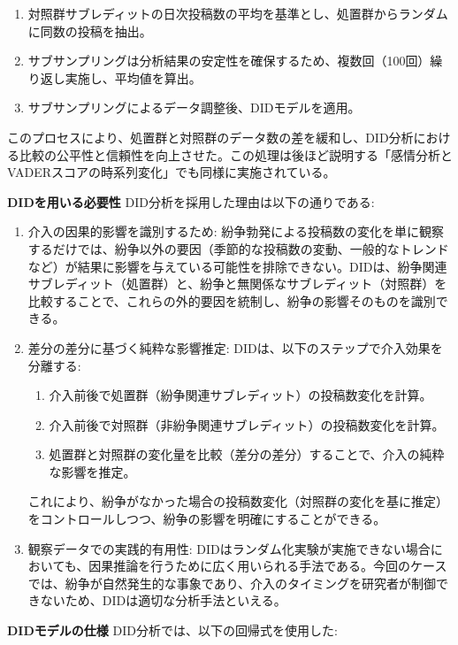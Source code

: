 \documentclass[11pt, a4j]{jreport}
\begin{document}
    \begin{enumerate}
        \item 対照群サブレディットの日次投稿数の平均を基準とし、処置群からランダムに同数の投稿を抽出。
        \item サブサンプリングは分析結果の安定性を確保するため、複数回（100回）繰り返し実施し、平均値を算出。
        \item サブサンプリングによるデータ調整後、DIDモデルを適用。
    \end{enumerate}

    このプロセスにより、処置群と対照群のデータ数の差を緩和し、DID分析における比較の公平性と信頼性を向上させた。この処理は後ほど説明する「感情分析とVADERスコアの時系列変化」でも同様に実施されている。

    \textbf{DIDを用いる必要性}
    DID分析を採用した理由は以下の通りである:
    \begin{enumerate}
        \item 介入の因果的影響を識別するため: 紛争勃発による投稿数の変化を単に観察するだけでは、紛争以外の要因（季節的な投稿数の変動、一般的なトレンドなど）が結果に影響を与えている可能性を排除できない。DIDは、紛争関連サブレディット（処置群）と、紛争と無関係なサブレディット（対照群）を比較することで、これらの外的要因を統制し、紛争の影響そのものを識別できる。
        \item 差分の差分に基づく純粋な影響推定: DIDは、以下のステップで介入効果を分離する:
            \begin{enumerate}
                \item 介入前後で処置群（紛争関連サブレディット）の投稿数変化を計算。
                \item 介入前後で対照群（非紛争関連サブレディット）の投稿数変化を計算。
                \item 処置群と対照群の変化量を比較（差分の差分）することで、介入の純粋な影響を推定。
            \end{enumerate}
            これにより、紛争がなかった場合の投稿数変化（対照群の変化を基に推定）をコントロールしつつ、紛争の影響を明確にすることができる。
        \item 観察データでの実践的有用性: DIDはランダム化実験が実施できない場合においても、因果推論を行うために広く用いられる手法である。今回のケースでは、紛争が自然発生的な事象であり、介入のタイミングを研究者が制御できないため、DIDは適切な分析手法といえる。
    \end{enumerate}
    \textbf{DIDモデルの仕様}
    DID分析では、以下の回帰式を使用した:
\end{document}
